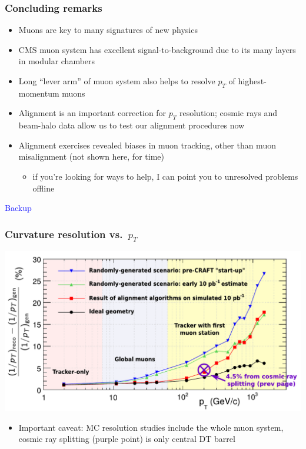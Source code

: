 \documentclass[compress]{beamer}
\begin{document}
\begin{frame}
\frametitle{Concluding remarks}

\begin{itemize}\setlength{\itemsep}{0.2 cm}
\item Muons are key to many signatures of new physics
\item CMS muon system has excellent signal-to-background due to its many layers in modular chambers
\item Long ``lever arm'' of muon system also helps to resolve $p_T$ of highest-momentum muons
\item Alignment is an important correction for $p_T$ resolution;
  cosmic rays and beam-halo data allow us to test our alignment
  procedures now
\item Alignment exercises revealed biases in muon tracking, other than muon misalignment (not shown here, for time)
\begin{itemize}
\item if you're looking for ways to help, I can point you to unresolved problems offline
\end{itemize}
\end{itemize}

\label{numpages}
\end{frame}

\begin{frame}
\begin{center}
\Huge \textcolor{blue}{Backup}
\end{center}
\end{frame}

\begin{frame}
\frametitle{Curvature resolution vs.~$p_T$}

\includegraphics[width=\linewidth]{curvature_resolution_cosmicpoint.pdf}

\begin{itemize}
\item Important caveat: MC resolution studies include the whole muon system, cosmic ray splitting (purple point) is only central DT barrel
\end{itemize}
\end{frame}
\end{document}
